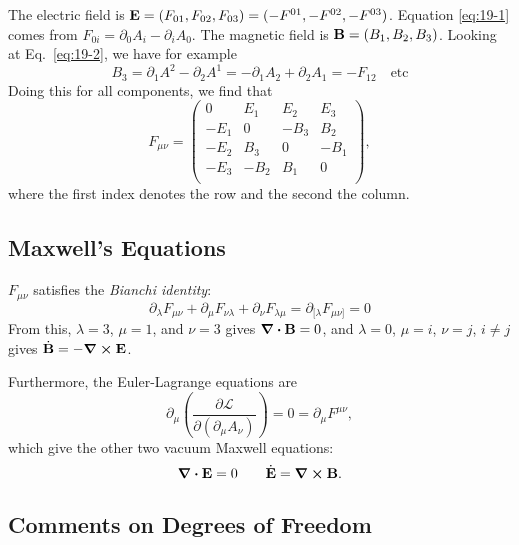 The electric field is $\vb{E} = (F_{01}, F_{02}, F_{03}) = (-F^{01}, - F^{02}, -F^{03})$. Equation \eqref{eq:19-1} comes from $F_{0i} = \partial_0 A_{i} - \partial_{i} A_0$.
The magnetic field is $\vb{B} = (B_1, B_2, B_3)$. Looking at Eq.~\eqref{eq:19-2}, we have for example 
\begin{equation}
  B_3 = \partial_1 A^2 - \partial_2 A^1 = -\partial_1 A_2 + \partial_2 A_1 = -F_{12} \quad \text{etc}
\end{equation}
Doing this for all components, we find that
\begin{equation}
  F_{\mu\nu} = 
  \begin{pmatrix}
   0 & E_1 & E_2 & E_3 \\
   -E_1 & 0 & -B_3 & B_2 \\
   -E_2 & B_3 & 0 & -B_1 \\
   -E_3 & -B_2 & B_1 & 0 \\
  \end{pmatrix},
\end{equation}
where the first index denotes the row and the second the column.

\subsection{Maxwell's Equations}%
\label{sub:maxwell_s_equations}

$F_{\mu\nu}$ satisfies the \emph{Bianchi identity}:
\begin{equation}
  \partial_{\lambda} F_{\mu\nu} + \partial_{\mu} F_{\nu\lambda} + \partial_{\nu} F_{\lambda\mu} = \partial_{[\lambda} F_{\mu\nu]} = 0
\end{equation}
From this, $\lambda = 3$, $\mu = 1$, and $\nu = 3$ gives $\div \vb{B} = 0$, and $\lambda = 0$, $\mu = i$, $\nu = j$, $i \neq j$ gives $\dot{\vb{B}} = -\curl \vb{E}$.

Furthermore, the Euler-Lagrange equations are 
\begin{equation}
  \partial_{\mu} \left( \frac{\partial \mathcal{L}}{\partial (\partial_{\mu} A_{\nu})} \right) = 0 = \partial_{\mu} F^{\mu\nu},
\end{equation}
which give the other two vacuum Maxwell equations: 
\begin{equation}
  \div \vb{E} = 0 \qquad \dot{\vb{E}} = \curl \vb{B}.
\end{equation}

\subsection{Comments on Degrees of Freedom}%
\label{sub:comments_on_degrees_of_freedom}

